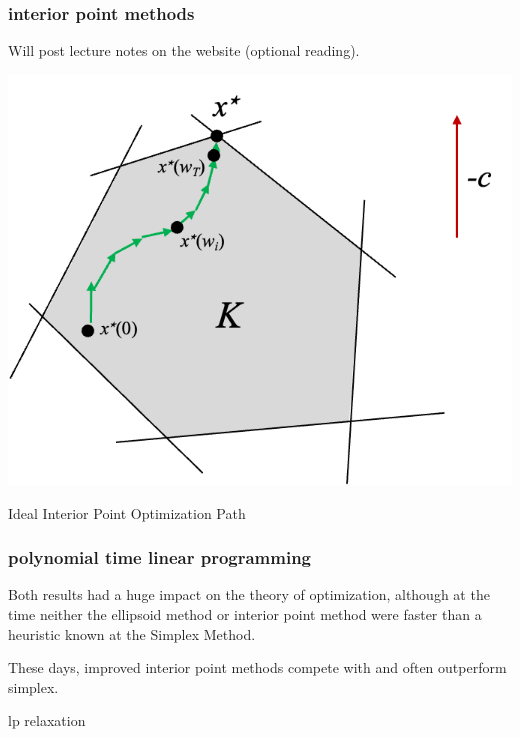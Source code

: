 \documentclass[compress]{beamer}
\begin{document}
\begin{frame}[t]
	\frametitle{interior point methods}
	Will post lecture notes on the website (optional reading).
	\begin{center}
		\includegraphics[width=.6\textwidth]{interior_point.png}
		
		Ideal Interior Point Optimization Path
	\end{center}
	
\end{frame}

\begin{frame}[t]
	\frametitle{polynomial time linear programming}
	Both results had a huge impact on the theory of optimization, although at the time neither the ellipsoid method or interior point method were faster than a heuristic known at the Simplex Method. 
	
	These days, improved interior point methods compete with and often outperform simplex. 
	
\end{frame}

\begin{frame}[standout]
	\begin{center}
			\large lp relaxation
		\end{center}
\end{frame}
\end{document}
